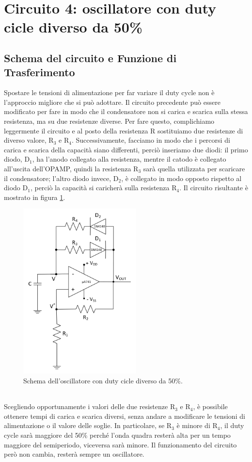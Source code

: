 \documentclass{report}
\begin{document}
\section{Circuito 4: oscillatore con duty cicle diverso da 50\%}
\subsection{Schema del circuito e Funzione di Trasferimento}
Spostare le tensioni di alimentazione per far variare il duty cycle non è l'approccio migliore che si può adottare. Il circuito precedente può essere modificato per fare in modo che il condensatore non si carica e scarica sulla stessa resistenza, ma su due resistenze diverse. Per fare questo, complichiamo leggermente il circuito e al posto della resistenza $\mathrm{R}$ sostituiamo due resistenze di diverso valore, $\mathrm{R_3}$ e $\mathrm{R_4}$. Successivamente, facciamo in modo che i percorsi di carica e scarica della capacità siano differenti, perciò inseriamo due diodi: il primo diodo, $\mathrm{D_1}$, ha l'anodo collegato alla resistenza, mentre il catodo è collegato all'uscita dell'OPAMP, quindi la resistenza $\mathrm{R_3}$ sarà quella utilizzata per scaricare il condensatore; l'altro diodo invece, $\mathrm{D_2}$, è collegato in modo opposto rispetto al diodo $\mathrm{D_1}$, perciò la capacità si caricherà sulla resistenza $\mathrm{R_4}$. Il circuito risultante è mostrato in figura \ref{figura:schema4}.
\begin{figure}[h!]
	\centering
	\includegraphics[height=9cm]{immagini/schema4}
	\caption{Schema dell'oscillatore con duty cicle diverso da 50\%.}
	\label{figura:schema4}
\end{figure}
\\Scegliendo opportunamente i valori delle due resistenze $\mathrm{R_3}$ e $\mathrm{R_4}$, è possibile ottenere tempi di carica e scarica diversi, senza andare a modificare le tensioni di alimentazione o il valore delle soglie. In particolare, se $\mathrm{R_3}$ è minore di $\mathrm{R_4}$, il duty cycle sarà maggiore del 50\% perché l'onda quadra resterà alta per un tempo maggiore del semiperiodo, viceversa sarà minore.  Il funzionamento del circuito però non cambia, resterà sempre un oscillatore. 
\end{document}
